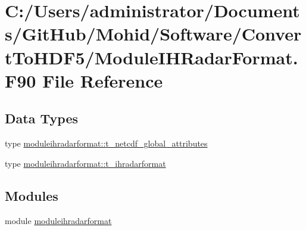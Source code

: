 \hypertarget{_module_i_h_radar_format_8_f90}{}\section{C\+:/\+Users/administrator/\+Documents/\+Git\+Hub/\+Mohid/\+Software/\+Convert\+To\+H\+D\+F5/\+Module\+I\+H\+Radar\+Format.F90 File Reference}
\label{_module_i_h_radar_format_8_f90}
\subsection*{Data Types}
\begin{DoxyCompactItemize}
\item 
type \mbox{\hyperlink{structmoduleihradarformat_1_1t__netcdf__global__attributes}{moduleihradarformat\+::t\+\_\+netcdf\+\_\+global\+\_\+attributes}}
\item 
type \mbox{\hyperlink{structmoduleihradarformat_1_1t__ihradarformat}{moduleihradarformat\+::t\+\_\+ihradarformat}}
\end{DoxyCompactItemize}
\subsection*{Modules}
\begin{DoxyCompactItemize}
\item 
module \mbox{\hyperlink{namespacemoduleihradarformat}{moduleihradarformat}}
\end{DoxyCompactItemize}
